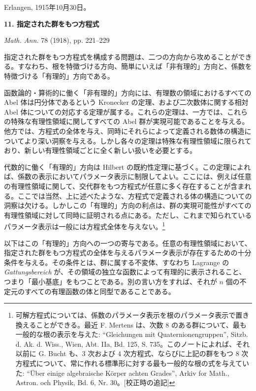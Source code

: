 \documentclass[11pt]{article}
\begin{document}
\medskip
\noindent Erlangen, 1915年10月30日。

\newpage

\begin{center}
{\Large\bfseries 11. 指定された群をもつ方程式}\par
\vspace{1.2em}
\emph{Math. Ann.} 78 (1918), pp. 221--229
\end{center}

\vspace{1.5em}

指定された群をもつ方程式を構成する問題は、二つの方向から攻めることができる。すなわち、根を特徴づける方向、簡単にいえば「非有理的」方向と、係数を特徴づける「有理的」方向である。

函数論的・算術的に働く「非有理的」方向には、有理数の領域におけるすべての Abel 体は円分体であるという Kronecker の定理、および二次数体に関する相対 Abel 体についての対応する定理が属する。これらの定理は、一方では、これらの特殊な有理性領域に関してすべての Abel 群が実現可能であることを与える。他方では、方程式の全体を与え、同時にそれらによって定義される数体の構造についてより深い洞察を与える。しかし各々の定理は特殊な有理性領域に限られており、新しい有理性領域ごとに全く新しい扱いを必要とする。

代数的に働く「有理的」方向は Hilbert の既約性定理に基づく。この定理によれば、係数の表示においてパラメータ表示に制限してよい。ここには、例えば任意の有理性領域に関して、交代群をもつ方程式が任意に多く存在することが含まれる。ここでは当然、上に述べたような、方程式で定義される体の構造についての洞察は欠ける。しかしこの「有理的」方向の利点は、群の実現可能性がすべての有理性領域に対して同時に証明される点にある。ただし、これまで知られているパラメータ表示は一般には方程式全体を与えない。\footnote{可解方程式については、係数のパラメータ表示を根のパラメータ表示で置き換えることができる。最近 F. Mertens は、次数 8 のある群について、最も一般的な根の表示を与えた: ``Gleichungen mit Quaternionengruppen'', Sitzb. d. Ak. d. Wiss., Wien, Abt. IIa, Bd. 125, S. 735。このノートによれば、それ以前に G. Bucht も、3 次および 4 次方程式、ならびに上記の群をもつ 8 次方程式について、常に作れる標準形に対する最も一般的な根の式を与えていた: ``Über einige algebraische Körper achten Grades'', Arkiv for Math., Astron. och Physik, Bd. 6, Nr. 30。[校正時の追記]}

以下はこの「有理的」方向への一つの寄与である。任意の有理性領域において、指定された群をもつ方程式の全体を与えるパラメータ表示が存在するための十分条件を与える。その条件とは、群に属する不変体、すなわち Lagrange の \emph{Gattungsbereich} が、その領域の独立な函数によって有理的に表示されること、つまり「最小基底」をもつことである。別の言い方をすれば、それが $n$ 個の不定元のすべての有理函数の体と同型であることである。
\end{document}
